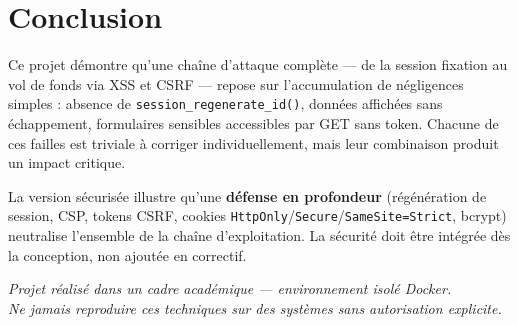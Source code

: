 \documentclass[12pt,a4paper]{report}
\begin{document}
\chapter{Conclusion}

Ce projet démontre qu'une chaîne d'attaque complète — de la session fixation au vol de fonds via XSS et CSRF — repose sur l'accumulation de négligences simples : absence de \texttt{session\_regenerate\_id()}, données affichées sans échappement, formulaires sensibles accessibles par GET sans token. Chacune de ces failles est triviale à corriger individuellement, mais leur combinaison produit un impact critique.

La version sécurisée illustre qu'une \textbf{défense en profondeur} (régénération de session, CSP, tokens CSRF, cookies \texttt{HttpOnly}/\texttt{Secure}/\texttt{SameSite=Strict}, bcrypt) neutralise l'ensemble de la chaîne d'exploitation. La sécurité doit être intégrée dès la conception, non ajoutée en correctif.

\bigskip
\begin{center}
\textcolor{comment-gray}{\small\textit{Projet réalisé dans un cadre académique — environnement isolé Docker.\\
Ne jamais reproduire ces techniques sur des systèmes sans autorisation explicite.}}
\end{center}
\end{document}
